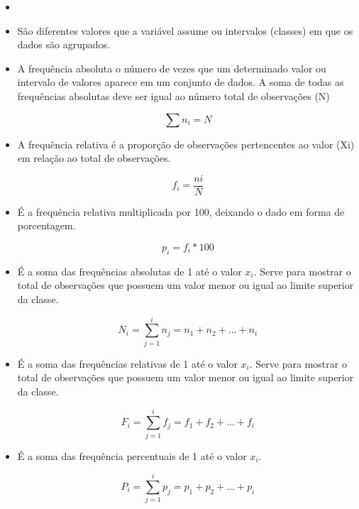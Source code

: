 \documentclass[a4paper,11pt]{article}
\begin{document}
\begin{itemize}
\item[]

    \item São diferentes valores que  a variável assume ou intervalos (classes) em que os dados são agrupados.

    \item A frequência absoluta o número de vezes que um determinado valor ou intervalo de valores aparece em um conjunto de dados. A soma de todas as frequências absolutas deve ser igual ao número total de observações (N)

    \[\sum n_i = N\]

    \item A frequência relativa é a proporção de observações pertencentes ao valor (Xi) em relação ao total de observações.

    \[f_i = \frac{ni}{N}\]

    \item É a frequência relativa multiplicada por 100, deixando o dado em forma de porcentagem.

    \[p_i = f_i * 100\]

    \item É a soma das frequências absolutas de 1 até o valor $x_i$. Serve para mostrar o total de observações que possuem um valor menor ou igual ao limite superior da classe.

    \[N_i = \sum_{j=1}^{i} n_j = n_1 + n_2 + ... + n_i\]

    \item É a soma das frequências relativas de 1 até o valor $x_i$. Serve para mostrar o total de observações que possuem um valor menor ou igual ao limite superior da classe.

    \[F_i = \sum_{j=1}^{i} f_j = f_1 + f_2 + ... + f_i\]

    \item É a soma das frequência percentuais de 1 até o valor $x_i$.

    \[P_i = \sum_{j=1}^{i} p_j = p_1 + p_2 + ... + p_i\]

\end{itemize}
\end{document}
